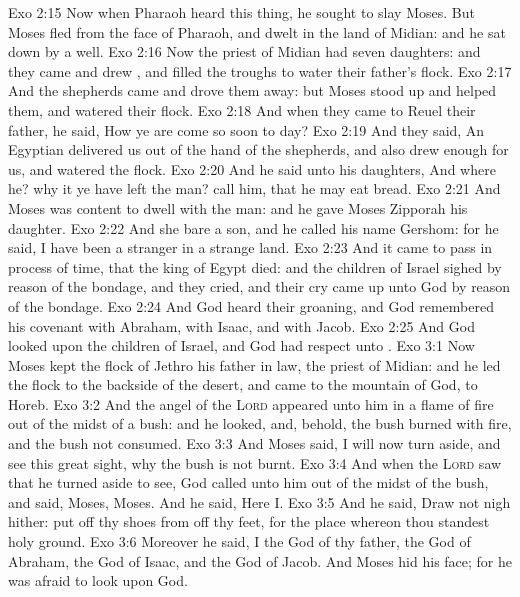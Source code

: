 \vs Exo 2:15 Now when Pharaoh heard this thing, he sought to slay Moses. But Moses fled from the face of Pharaoh, and dwelt in the land of Midian: and he sat down by a well.
\vs Exo 2:16 Now the priest of Midian had seven daughters: and they came and drew , and filled the troughs to water their father's flock.
\vs Exo 2:17 And the shepherds came and drove them away: but Moses stood up and helped them, and watered their flock.
\vs Exo 2:18 And when they came to Reuel their father, he said, How  ye are come so soon to day?
\vs Exo 2:19 And they said, An Egyptian delivered us out of the hand of the shepherds, and also drew  enough for us, and watered the flock.
\vs Exo 2:20 And he said unto his daughters, And where  he? why  it  ye have left the man? call him, that he may eat bread.
\vs Exo 2:21 And Moses was content to dwell with the man: and he gave Moses Zipporah his daughter.
\vs Exo 2:22 And she bare  a son, and he called his name Gershom: for he said, I have been a stranger in a strange land.
\vs Exo 2:23 And it came to pass in process of time, that the king of Egypt died: and the children of Israel sighed by reason of the bondage, and they cried, and their cry came up unto God by reason of the bondage.
\vs Exo 2:24 And God heard their groaning, and God remembered his covenant with Abraham, with Isaac, and with Jacob.
\vs Exo 2:25 And God looked upon the children of Israel, and God had respect unto .
\vs Exo 3:1 Now Moses kept the flock of Jethro his father in law, the priest of Midian: and he led the flock to the backside of the desert, and came to the mountain of God,  to Horeb.
\vs Exo 3:2 And the angel of the \textsc{Lord} appeared unto him in a flame of fire out of the midst of a bush: and he looked, and, behold, the bush burned with fire, and the bush  not consumed.
\vs Exo 3:3 And Moses said, I will now turn aside, and see this great sight, why the bush is not burnt.
\vs Exo 3:4 And when the \textsc{Lord} saw that he turned aside to see, God called unto him out of the midst of the bush, and said, Moses, Moses. And he said, Here  I.
\vs Exo 3:5 And he said, Draw not nigh hither: put off thy shoes from off thy feet, for the place whereon thou standest  holy ground.
\vs Exo 3:6 Moreover he said, I  the God of thy father, the God of Abraham, the God of Isaac, and the God of Jacob. And Moses hid his face; for he was afraid to look upon God.
